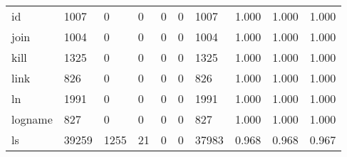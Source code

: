 \begin{longtable}{lp{2.0cm}p{2.0cm}p{2.0cm}p{2.0cm}p{2.0cm}p{2.0cm}p{2.0cm}p{2.0cm}p{2.0cm}}
id        &                   1007 &                                  0 &                                 0 &                                0 &                                 0 &                            1007 &                                   1.000 &                                  1.000 &                                1.000 \\
join      &                   1004 &                                  0 &                                 0 &                                0 &                                 0 &                            1004 &                                   1.000 &                                  1.000 &                                1.000 \\
kill      &                   1325 &                                  0 &                                 0 &                                0 &                                 0 &                            1325 &                                   1.000 &                                  1.000 &                                1.000 \\
link      &                    826 &                                  0 &                                 0 &                                0 &                                 0 &                             826 &                                   1.000 &                                  1.000 &                                1.000 \\
ln        &                   1991 &                                  0 &                                 0 &                                0 &                                 0 &                            1991 &                                   1.000 &                                  1.000 &                                1.000 \\
logname   &                    827 &                                  0 &                                 0 &                                0 &                                 0 &                             827 &                                   1.000 &                                  1.000 &                                1.000 \\
ls        &                  39259 &                               1255 &                                21 &                                0 &                                 0 &                           37983 &                                   0.968 &                                  0.968 &                                0.967 \\

\end{longtable}
